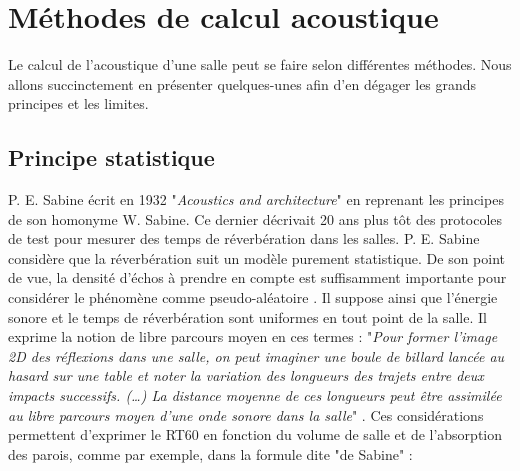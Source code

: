 \section{Méthodes de calcul acoustique} 
Le calcul de l'acoustique d'une salle peut se faire selon différentes méthodes. Nous allons succinctement en présenter quelques-unes afin d'en dégager les grands principes et les limites.

	\subsection{Principe statistique} \label{sect_sabine}

P. E. Sabine écrit en 1932 "\textit{Acoustics and architecture}" en reprenant les principes de son homonyme W. Sabine. Ce dernier décrivait 20 ans plus tôt des protocoles de test pour mesurer des temps de réverbération dans les salles. P. E. Sabine considère que la réverbération suit un modèle purement statistique. De son point de vue, la densité d'échos à prendre en compte est suffisamment importante pour considérer le phénomène comme pseudo-aléatoire \cite[p. 19]{Kandelman}. Il suppose ainsi que l’énergie sonore et le temps de réverbération sont uniformes en tout point de la salle. Il exprime la notion de libre parcours moyen en ces termes : "\textit{Pour former l’image 2D des réflexions dans une salle, on peut imaginer une boule de billard lancée au hasard sur une table et noter la variation des longueurs des trajets entre deux impacts successifs. (…) La distance moyenne de ces longueurs peut être assimilée au libre parcours moyen d’une onde sonore dans la salle}" \cite[]{sabine2}. Ces considérations permettent d'exprimer le \gls{RT60} en fonction du volume de salle et de l'absorption des parois, comme par exemple, dans la formule dite "de Sabine" \cite[p. 71-81]{jouhaneau}: 

